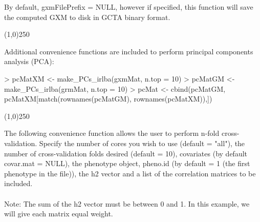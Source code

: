 \documentclass[a4paper]{article}
\begin{document}
By default, gxmFilePrefix = NULL, however if specified, this function will save the computed GXM to disk in GCTA binary format.
\begin{center}
\line(1,0){250}
\end{center}
Additional convenience functions are included to perform principal components analysis (PCA):
\begin{Schunk}

\begin{Schunk}
\begin{Sinput}
> pcMatXM <- make_PCs_irlba(gxmMat, n.top = 10)
> pcMatGM <- make_PCs_irlba(grmMat, n.top = 10)
> pcMat <- cbind(pcMatGM, pcMatXM[match(rownames(pcMatGM), rownames(pcMatXM)),])
\end{Sinput}
\end{Schunk}

\end{Schunk}
\begin{center}
\line(1,0){250}
\end{center}
The following convenience function allows the user to perform n-fold cross-validation. Specify the number of cores you wish to use (default = "all"), the number of cross-validation folds desired (default = 10), covariates (by default covar.mat = NULL), the phenotype object, pheno.id (by default = 1 (the first phenotype in the file)), the h2 vector and a list of the correlation matrices to be included.
 \\
\\
Note: The sum of the h2 vector must be between 0 and 1. In this example, we will give each matrix equal weight.
\end{document}
